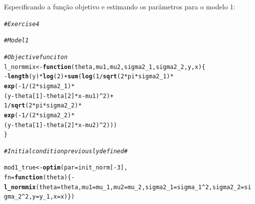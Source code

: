 \documentclass{homework}\usepackage[]{graphicx}\usepackage[]{color}
\makeatletter
\newcommand{\hlnum}[1]{\textcolor[rgb]{0.686,0.059,0.569}{#1}}%
\newcommand{\hlcom}[1]{\textcolor[rgb]{0.678,0.584,0.686}{\textit{#1}}}%
\newcommand{\hlopt}[1]{\textcolor[rgb]{0,0,0}{#1}}%
\newcommand{\hlstd}[1]{\textcolor[rgb]{0.345,0.345,0.345}{#1}}%
\newcommand{\hlkwa}[1]{\textcolor[rgb]{0.161,0.373,0.58}{\textbf{#1}}}%
\newcommand{\hlkwb}[1]{\textcolor[rgb]{0.69,0.353,0.396}{#1}}%
\newcommand{\hlkwc}[1]{\textcolor[rgb]{0.333,0.667,0.333}{#1}}%
\newcommand{\hlkwd}[1]{\textcolor[rgb]{0.737,0.353,0.396}{\textbf{#1}}}%
\newenvironment{kframe}{%
 \def\at@end@of@kframe{}%
 \ifinner\ifhmode%
  \def\at@end@of@kframe{\end{minipage}}%
  \begin{minipage}{\columnwidth}%
 \fi\fi%
 \def\FrameCommand##1{\hskip\@totalleftmargin \hskip-\fboxsep
 \colorbox{shadecolor}{##1}\hskip-\fboxsep
     \hskip-\linewidth \hskip-\@totalleftmargin \hskip\columnwidth}%
 \MakeFramed {\advance\hsize-\width
   \@totalleftmargin\z@ \linewidth\hsize
   \@setminipage}}%
 {\par\unskip\endMakeFramed%
 \at@end@of@kframe}
\newenvironment{knitrout}{}{} %
\makeatother
\begin{document}
\begin{enumerate}

Especificando a função objetivo e estimando os parâmetros para o modelo 1:

\begin{knitrout}
\color{fgcolor}\begin{kframe}
\begin{alltt}
\hlcom{# Exercise 4}

\hlcom{# Model 1}

\hlcom{# Objective funciton}
\hlstd{l_normmix} \hlkwb{<-} \hlkwa{function}\hlstd{(}\hlkwc{theta}\hlstd{,} \hlkwc{mu1}\hlstd{,} \hlkwc{mu2}\hlstd{,} \hlkwc{sigma2_1}\hlstd{,} \hlkwc{sigma2_2}\hlstd{,} \hlkwc{y}\hlstd{,} \hlkwc{x}\hlstd{)\{}
  \hlopt{-}\hlkwd{length}\hlstd{(y)}\hlopt{*}\hlkwd{log}\hlstd{(}\hlnum{2}\hlstd{)}\hlopt{+} \hlkwd{sum}\hlstd{(}\hlkwd{log}\hlstd{(}\hlnum{1}\hlopt{/}\hlkwd{sqrt}\hlstd{(}\hlnum{2}\hlopt{*}\hlstd{pi}\hlopt{*}\hlstd{sigma2_1)}\hlopt{*}
                               \hlkwd{exp}\hlstd{(}\hlopt{-}\hlnum{1}\hlopt{/}\hlstd{(}\hlnum{2}\hlopt{*}\hlstd{sigma2_1)}\hlopt{*}
                                     \hlstd{(y} \hlopt{-} \hlstd{theta[}\hlnum{1}\hlstd{]} \hlopt{-} \hlstd{theta[}\hlnum{2}\hlstd{]} \hlopt{*} \hlstd{x} \hlopt{-} \hlstd{mu1)}\hlopt{^}\hlnum{2}\hlstd{)} \hlopt{+}
                           \hlnum{1}\hlopt{/}\hlkwd{sqrt}\hlstd{(}\hlnum{2}\hlopt{*}\hlstd{pi}\hlopt{*}\hlstd{sigma2_2)}\hlopt{*}
                           \hlkwd{exp}\hlstd{(}\hlopt{-}\hlnum{1}\hlopt{/}\hlstd{(}\hlnum{2}\hlopt{*}\hlstd{sigma2_2)} \hlopt{*}
                                 \hlstd{(y} \hlopt{-} \hlstd{theta[}\hlnum{1}\hlstd{]} \hlopt{-} \hlstd{theta[}\hlnum{2}\hlstd{]} \hlopt{*} \hlstd{x} \hlopt{-} \hlstd{mu2)}\hlopt{^}\hlnum{2}\hlstd{)))}
\hlstd{\}}

\hlcom{# Initial condition previously defined #}

\hlstd{mod1_true} \hlkwb{<-} \hlkwd{optim}\hlstd{(}\hlkwc{par} \hlstd{= init_norm[}\hlopt{-}\hlnum{3}\hlstd{],}
      \hlkwc{fn} \hlstd{=} \hlkwa{function}\hlstd{(}\hlkwc{theta}\hlstd{)\{}\hlopt{-}\hlkwd{l_normmix}\hlstd{(}\hlkwc{theta} \hlstd{= theta,} \hlkwc{mu1} \hlstd{= mu_1,} \hlkwc{mu2} \hlstd{= mu_2,} \hlkwc{sigma2_1} \hlstd{= sigma_1}\hlopt{^}\hlnum{2}\hlstd{,} \hlkwc{sigma2_2} \hlstd{= sigma_2}\hlopt{^}\hlnum{2}\hlstd{,} \hlkwc{y} \hlstd{= y_1,} \hlkwc{x}\hlstd{=x)\})}
\end{alltt}
\end{kframe}
\end{knitrout}


\end{enumerate}
\end{document}
